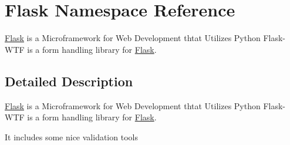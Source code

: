 \hypertarget{namespace_flask}{}\section{Flask Namespace Reference}
\label{namespace_flask}


\mbox{\hyperlink{namespace_flask}{Flask}} is a Microframework for Web Development thtat Utilizes Python Flask-\/\+W\+TF is a form handling library for \mbox{\hyperlink{namespace_flask}{Flask}}.  




\subsection{Detailed Description}
\mbox{\hyperlink{namespace_flask}{Flask}} is a Microframework for Web Development thtat Utilizes Python Flask-\/\+W\+TF is a form handling library for \mbox{\hyperlink{namespace_flask}{Flask}}. 

It includes some nice validation tools 
